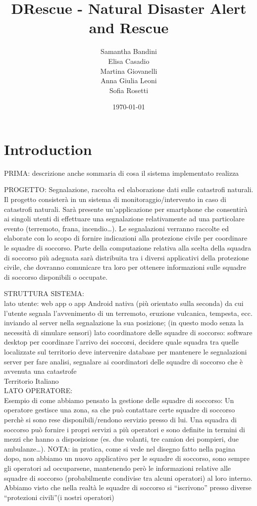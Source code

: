 \documentclass[a4paper,12pt]{report}
\title{DRescue - Natural Disaster Alert and Rescue}
\author{Samantha Bandini\\Elisa Casadio\\Martina Giovanelli\\Anna Giulia Leoni\\Sofia Rosetti}
\date{\today}
\begin{document}
\maketitle

\tableofcontents

\chapter{Introduction}

{PRIMA: descrizione anche sommaria di cosa il sistema implementato realizza}

PROGETTO: Segnalazione, raccolta ed elaborazione dati sulle catastrofi naturali.\\

Il progetto consisterà in un sistema di monitoraggio/intervento in caso di catastrofi naturali. Sarà presente un’applicazione per smartphone che consentirà ai singoli utenti di effettuare una segnalazione relativamente ad una particolare evento (terremoto, frana, incendio…). Le segnalazioni verranno raccolte ed elaborate con lo scopo di fornire indicazioni alla protezione civile per coordinare le squadre di soccorso.
Parte della computazione relativa alla scelta della squadra di soccorso più adeguata sarà distribuita tra i diversi applicativi della protezione civile, che dovranno comunicare tra loro per ottenere informazioni sulle squadre di soccorso disponibili o occupate.


STRUTTURA SISTEMA:\\
lato utente: web app o app Android nativa (più orientato sulla seconda) da cui l’utente segnala l’avvenimento di un terremoto, eruzione vulcanica, tempesta, ecc. inviando al server nella segnalazione la sua posizione; (in questo modo senza la necessità di simulare sensori)
lato coordinatore delle squadre di soccorso: software desktop per coordinare l’arrivo dei soccorsi, decidere quale squadra tra quelle localizzate sul territorio deve intervenire
database per mantenere le segnalazioni
server per fare analisi, segnalare ai coordinatori delle squadre di soccorso che è avvenuta una catastrofe\\

Territorio Italiano\\

LATO OPERATORE: \\
Esempio di come abbiamo pensato la gestione delle squadre di soccorso: 
Un operatore gestisce una zona, sa che può contattare certe squadre di soccorso perchè si sono rese disponibili/rendono servizio presso di lui. Una squadra di soccorso può fornire i propri servizi a più operatori e sono definite in termini di mezzi che hanno a disposizione (es. due volanti, tre camion dei pompieri, due ambulanze…). 
{NOTA: in pratica, come si vede nel disegno fatto nella pagina dopo, non abbiamo un nuovo applicativo per le squadre di soccorso, sono sempre gli operatori ad occuparsene, mantenendo però le informazioni relative alle squadre di soccorso (probabilmente condivise tra alcuni operatori) al loro interno. Abbiamo visto che nella realtà le squadre di soccorso si “iscrivono” presso diverse “protezioni civili”(i nostri operatori)}\\
\end{document}
